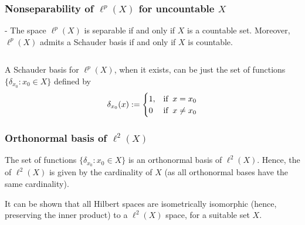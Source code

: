 \documentclass[12pt]{article}
\begin{document}
\subsubsection{Nonseparability of $\ell^p(X)$ for uncountable $X$}

\emph{} - The space $\ell^p(X)$ is separable if and only if $X$ is a countable set. Moreover, $\ell^p(X)$ admits a Schauder basis if and only if $X$ is countable.

$\,$

A Schauder basis for $\ell^p(X)$, when it exists, can be just the set of functions $\{\delta_{x_0}: x_0 \in X\}$ defined by
\begin{displaymath}
\delta_{x_0}(x) :=
\begin{cases}
1, & $if$\;\; x=x_0\\
0 & $if$\;\; x \neq x_0
\end{cases}
\end{displaymath}

\subsubsection{Orthonormal basis of $\ell^2(X)$}

The set of functions $\{\delta_{x_0}: x_0 \in X\}$ 
is an orthonormal basis of $\ell^2(X)$. Hence, the  of $\ell^2(X)$ is given by the cardinality of $X$ (as all orthonormal bases have the same cardinality).

It can be shown that all Hilbert spaces are isometrically isomorphic (hence, preserving the inner product) to a $\ell^2(X)$ space, for a suitable set $X$.
\end{document}
